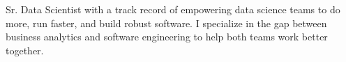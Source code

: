 
\begin{cvparagraph}

  Sr. Data Scientist with a track record of empowering data science teams to do
  more, run faster, and build robust software. I specialize in the gap between
  business analytics and software engineering to help both teams work better
  together.
\end{cvparagraph}
